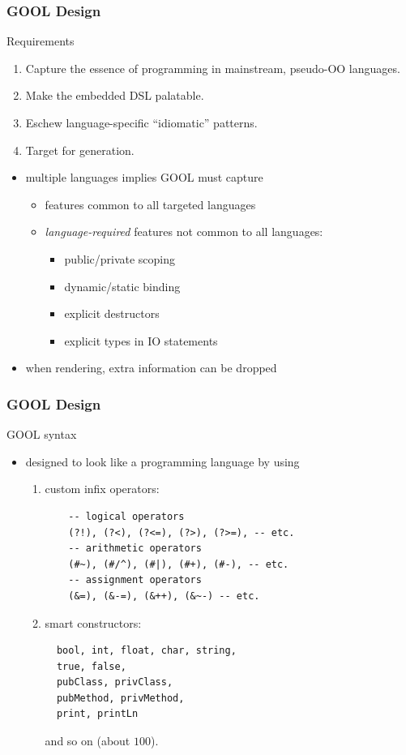 \documentclass{beamer}
\begin{document}
\begin{frame}
\frametitle{GOOL Design}
{\Large Requirements}
\begin{enumerate}
\item Capture the essence of programming in mainstream, pseudo-OO languages.
\item Make the embedded DSL palatable.
\item Eschew language-specific ``idiomatic'' patterns.
\item Target for generation.
\end{enumerate}
\pause
\begin{itemize}
\item multiple languages implies GOOL must capture
\begin{itemize}
\item<3-> features common to all targeted languages
\item<4-> \emph{language-required} features not common to all languages:
\begin{itemize}
\item public/private scoping
\item dynamic/static binding
\item explicit destructors
\item explicit types in IO statements
\end{itemize}
\end{itemize}
\item<5-> when rendering, extra information can be dropped
\end{itemize}
\end{frame}

\begin{frame}
\frametitle{GOOL Design}
{\Large GOOL syntax}
\begin{itemize}
\item designed to look like a programming language by using
\begin{enumerate}
\item<2-> custom infix operators:
\begin{lstlisting}
    -- logical operators
    (?!), (?<), (?<=), (?>), (?>=), -- etc.
    -- arithmetic operators
    (#~), (#/^), (#|), (#+), (#-), -- etc.
    -- assignment operators
    (&=), (&-=), (&++), (&~-) -- etc.
\end{lstlisting}
\item<3-> smart constructors:
\begin{lstlisting}
  bool, int, float, char, string,
  true, false,
  pubClass, privClass, 
  pubMethod, privMethod,
  print, printLn
\end{lstlisting}
and so on (about $100$).
\end{enumerate}
\end{itemize}
\end{frame}
\end{document}
